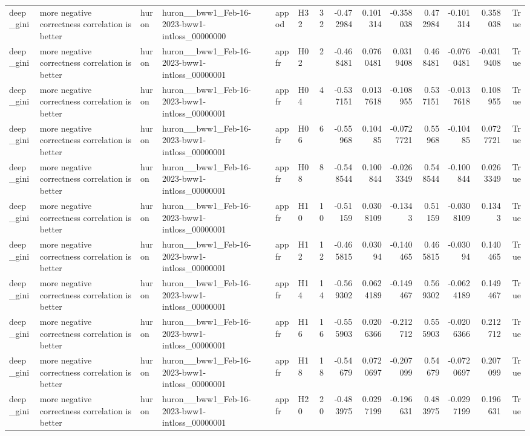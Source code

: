 \begin{longtable}{llllllrrrrrrrr}
deep\_gini & more negative correctness correlation is better & huron & huron\_\_bww1\_Feb-16-2023-bww1-intloss\_00000000 & appod & H32 & 32 & -0.472984 & 0.101314 & -0.358038 & 0.472984 & -0.101314 & 0.358038 & True \\
deep\_gini & more negative correctness correlation is better & huron & huron\_\_bww1\_Feb-16-2023-bww1-intloss\_00000001 & appfr & H02 & 2 & -0.468481 & 0.0760481 & 0.0319408 & 0.468481 & -0.0760481 & -0.0319408 & True \\
deep\_gini & more negative correctness correlation is better & huron & huron\_\_bww1\_Feb-16-2023-bww1-intloss\_00000001 & appfr & H04 & 4 & -0.537151 & 0.0137618 & -0.108955 & 0.537151 & -0.0137618 & 0.108955 & True \\
deep\_gini & more negative correctness correlation is better & huron & huron\_\_bww1\_Feb-16-2023-bww1-intloss\_00000001 & appfr & H06 & 6 & -0.55968 & 0.10485 & -0.0727721 & 0.55968 & -0.10485 & 0.0727721 & True \\
deep\_gini & more negative correctness correlation is better & huron & huron\_\_bww1\_Feb-16-2023-bww1-intloss\_00000001 & appfr & H08 & 8 & -0.548544 & 0.100844 & -0.0263349 & 0.548544 & -0.100844 & 0.0263349 & True \\
deep\_gini & more negative correctness correlation is better & huron & huron\_\_bww1\_Feb-16-2023-bww1-intloss\_00000001 & appfr & H10 & 10 & -0.51159 & 0.0308109 & -0.1343 & 0.51159 & -0.0308109 & 0.1343 & True \\
deep\_gini & more negative correctness correlation is better & huron & huron\_\_bww1\_Feb-16-2023-bww1-intloss\_00000001 & appfr & H12 & 12 & -0.465815 & 0.03094 & -0.140465 & 0.465815 & -0.03094 & 0.140465 & True \\
deep\_gini & more negative correctness correlation is better & huron & huron\_\_bww1\_Feb-16-2023-bww1-intloss\_00000001 & appfr & H14 & 14 & -0.569302 & 0.0624189 & -0.149467 & 0.569302 & -0.0624189 & 0.149467 & True \\
deep\_gini & more negative correctness correlation is better & huron & huron\_\_bww1\_Feb-16-2023-bww1-intloss\_00000001 & appfr & H16 & 16 & -0.555903 & 0.0206366 & -0.212712 & 0.555903 & -0.0206366 & 0.212712 & True \\
deep\_gini & more negative correctness correlation is better & huron & huron\_\_bww1\_Feb-16-2023-bww1-intloss\_00000001 & appfr & H18 & 18 & -0.54679 & 0.0720697 & -0.207099 & 0.54679 & -0.0720697 & 0.207099 & True \\
deep\_gini & more negative correctness correlation is better & huron & huron\_\_bww1\_Feb-16-2023-bww1-intloss\_00000001 & appfr & H20 & 20 & -0.483975 & 0.0297199 & -0.196631 & 0.483975 & -0.0297199 & 0.196631 & True \\

\end{longtable}
